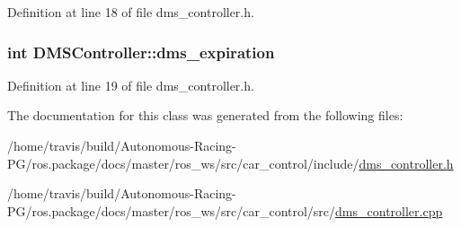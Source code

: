 Definition at line 18 of file dms\+\_\+controller.\+h.

\subsubsection[{\texorpdfstring{dms\+\_\+expiration}{dms_expiration}}]{\setlength{\rightskip}{0pt plus 5cm}int D\+M\+S\+Controller\+::dms\+\_\+expiration}\hypertarget{class_d_m_s_controller_ad835733c22abe62af494005124f1c9fe}{}\label{class_d_m_s_controller_ad835733c22abe62af494005124f1c9fe}


Definition at line 19 of file dms\+\_\+controller.\+h.



The documentation for this class was generated from the following files\+:\begin{DoxyCompactItemize}
\item 
/home/travis/build/\+Autonomous-\/\+Racing-\/\+P\+G/ros.\+package/docs/master/ros\+\_\+ws/src/car\+\_\+control/include/\hyperlink{dms__controller_8h}{dms\+\_\+controller.\+h}\item 
/home/travis/build/\+Autonomous-\/\+Racing-\/\+P\+G/ros.\+package/docs/master/ros\+\_\+ws/src/car\+\_\+control/src/\hyperlink{dms__controller_8cpp}{dms\+\_\+controller.\+cpp}\end{DoxyCompactItemize}
